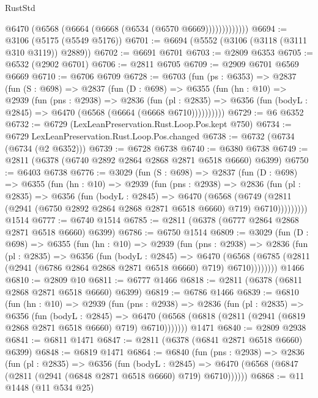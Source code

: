 \begin{lexlean}{RustStd}
\begin{coremodule}
                  @6470 (@6568 (@6664 (@6668 (@6534 (@6570 @6669)))))))))))))
@6694 := @3106 (@5175 (@5549 @5176))
@6701 := @6694 (@5552 (@3106 (@3118 (@3111 @310 @3119)) @2889))
@6702 := @6691 @6701
@6703 := @2809 @6353
@6705 := @6532 (@2902 @6701)
@6706 := @2811 @6705
@6709 := @2909 @6701 @6569 @6669
@6710 := @6706 @6709
@6728 := @6703
    (fun (ps : @6353) =>
    @2837
      (fun (S : @698) =>
      @2837
        (fun (D : @698) =>
        @6355
          (fun (hn : @10) =>
          @2939
            (fun (pns : @2938) =>
            @2836
              (fun (pl : @2835) =>
              @6356 (fun (bodyL : @2845) => @6470 (@6568 (@6664 (@6668 @6710))))))))))
@6729 := @6 @6352
@6732 := @6729 (LexLeanPreservation.Rust.Loop.Pos.kept @750)
@6734 := @6729 LexLeanPreservation.Rust.Loop.Pos.changed
@6738 := @6732 (@6734 (@6734 (@2 @6352)))
@6739 := @6728 @6738
@6740 := @6380 @6738
@6749 := @2811 (@6378 (@6740 @2892 @2864 @2868 @2871 @6518 @6660) @6399)
@6750 := @6403 @6738
@6776 := @3029
    (fun (S : @698) =>
    @2837
      (fun (D : @698) =>
      @6355
        (fun (hn : @10) =>
        @2939
          (fun (pns : @2938) =>
          @2836
            (fun (pl : @2835) =>
            @6356
              (fun (bodyL : @2845) =>
              @6470
                (@6568
                  (@6749
                    (@2811 (@2941 (@6750 @2892 @2864 @2868 @2871 @6518 @6660) @719) @6710)))))))))
    @1514
@6777 := @6740 @1514
@6785 := @2811 (@6378 (@6777 @2864 @2868 @2871 @6518 @6660) @6399)
@6786 := @6750 @1514
@6809 := @3029
    (fun (D : @698) =>
    @6355
      (fun (hn : @10) =>
      @2939
        (fun (pns : @2938) =>
        @2836
          (fun (pl : @2835) =>
          @6356
            (fun (bodyL : @2845) =>
            @6470
              (@6568 (@6785 (@2811 (@2941 (@6786 @2864 @2868 @2871 @6518 @6660) @719) @6710))))))))
    @1466
@6810 := @2809 @10
@6811 := @6777 @1466
@6818 := @2811 (@6378 (@6811 @2868 @2871 @6518 @6660) @6399)
@6819 := @6786 @1466
@6839 := @6810
    (fun (hn : @10) =>
    @2939
      (fun (pns : @2938) =>
      @2836
        (fun (pl : @2835) =>
        @6356
          (fun (bodyL : @2845) =>
          @6470 (@6568 (@6818 (@2811 (@2941 (@6819 @2868 @2871 @6518 @6660) @719) @6710)))))))
    @1471
@6840 := @2809 @2938
@6841 := @6811 @1471
@6847 := @2811 (@6378 (@6841 @2871 @6518 @6660) @6399)
@6848 := @6819 @1471
@6864 := @6840
    (fun (pns : @2938) =>
    @2836
      (fun (pl : @2835) =>
      @6356
        (fun (bodyL : @2845) =>
        @6470 (@6568 (@6847 (@2811 (@2941 (@6848 @2871 @6518 @6660) @719) @6710))))))
@6868 := @11 @1448 (@11 @534 @25)

\end{coremodule}
\end{lexlean}
